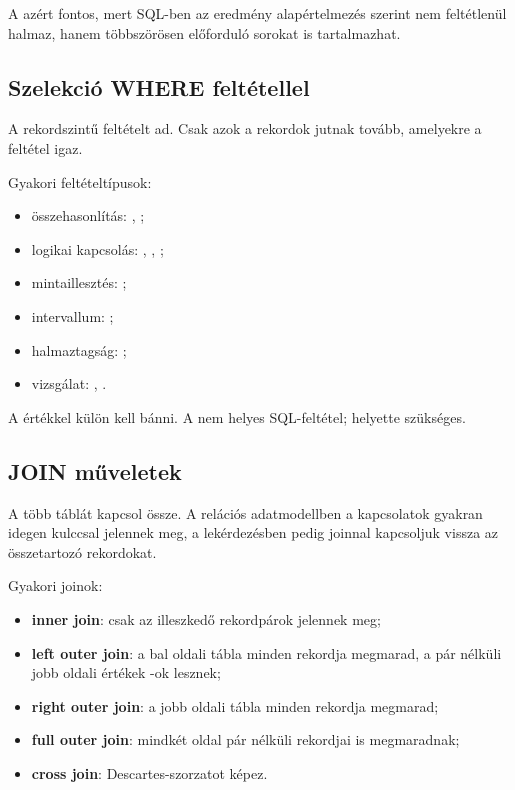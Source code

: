A  azért fontos, mert SQL-ben az eredmény alapértelmezés szerint nem feltétlenül halmaz, hanem többszörösen előforduló sorokat is tartalmazhat.

\subsection{Szelekció WHERE feltétellel}

A  rekordszintű feltételt ad. Csak azok a rekordok jutnak tovább, amelyekre a feltétel igaz.

Gyakori feltételtípusok:

\begin{itemize}
  \item összehasonlítás: , ;
  \item logikai kapcsolás: , , ;
  \item mintaillesztés: ;
  \item intervallum: ;
  \item halmaztagság: ;
  \item {} vizsgálat: , .
\end{itemize}

A  értékkel külön kell bánni. A  nem helyes SQL-feltétel; helyette  szükséges.

\subsection{JOIN műveletek}

A  több táblát kapcsol össze. A relációs adatmodellben a kapcsolatok gyakran idegen kulccsal jelennek meg, a lekérdezésben pedig joinnal kapcsoljuk vissza az összetartozó rekordokat.

Gyakori joinok:

\begin{itemize}
  \item \textbf{inner join}: csak az illeszkedő rekordpárok jelennek meg;
  \item \textbf{left outer join}: a bal oldali tábla minden rekordja megmarad, a pár nélküli jobb oldali értékek -ok lesznek;
  \item \textbf{right outer join}: a jobb oldali tábla minden rekordja megmarad;
  \item \textbf{full outer join}: mindkét oldal pár nélküli rekordjai is megmaradnak;
  \item \textbf{cross join}: Descartes-szorzatot képez.
\end{itemize}

